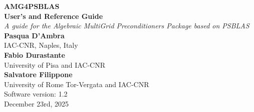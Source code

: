 \documentclass[a4paper,twoside,11pt]{article}
\begin{document}
{\LARGE\bfseries AMG4PSBLAS\\[.8ex] User's and Reference Guide}\\[\baselineskip]
\emph{\large A guide for the Algebraic MultiGrid Preconditioners Package based on PSBLAS}\\[3ex]
{\large\bfseries Pasqua D'Ambra}\\
\large IAC-CNR, Naples, Italy\\[3ex]
{\large\bfseries Fabio Durastante}\\
\large University of Pisa and IAC-CNR\\[3ex]
{\large\bfseries Salvatore Filippone} \\
\large University of Rome Tor-Vergata and IAC-CNR
\\[10ex]
Software version: 1.2\\
 December 23rd, 2025
\clearpage
\ \\
\thispagestyle{empty}
\clearpage

\setcounter{page}{1}    %


\cleardoublepage

\begingroup
  \renewcommand*{\thepage}{toc}
  \tableofcontents
\endgroup  
\cleardoublepage

\setcounter{page}{1}    %









\cleardoublepage
\appendix


\cleardoublepage

\end{document}
